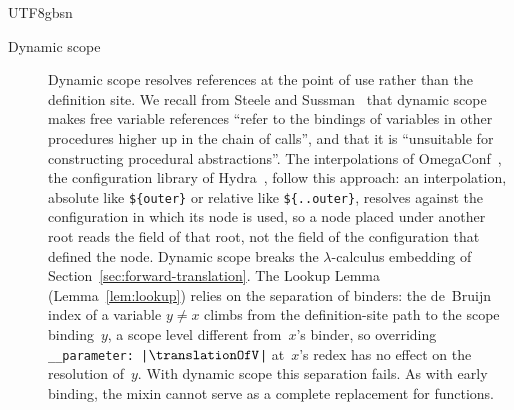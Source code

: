 \begin{CJK*}{UTF8}{gbsn}
\begin{description}
  \item[Dynamic scope]
    Dynamic scope resolves references at the point of use rather than
    the definition site.
    We recall from Steele and
    Sussman~\cite{steele1978-art-of-the-interpreter} that dynamic scope
    makes free variable references ``refer to the bindings of variables
    in other procedures higher up in the chain of calls'', and that it
    is ``unsuitable for constructing procedural abstractions''.
    The interpolations of OmegaConf~\cite{yadan2018-omegaconf}, the
    configuration library of Hydra~\cite{yadan2023-hydra}, follow
    this approach: an interpolation, absolute like
    \texttt{\$\{outer\}} or relative like \texttt{\$\{..outer\}},
    resolves against the configuration in which its node is used, so
    a node placed under another root reads the field of that root,
    not the field of the configuration that defined the node.
    Dynamic scope breaks the $\lambda$-calculus embedding
    of Section~\ref{sec:forward-translation}.
    The Lookup Lemma (Lemma~\ref{lem:lookup})
    relies on the separation of binders:
    the de~Bruijn index of a variable $y \neq x$ climbs from the
    definition-site path to the scope binding~$y$, a scope
    level different from~$x$'s binder, so overriding
    \texttt{__parameter: |$\translationOfV$|} at~$x$'s redex
    has no effect on the resolution of~$y$.
    With dynamic scope this separation fails.
    As with early binding, the mixin cannot serve as a complete
    replacement for functions.


\end{description}
\end{CJK*}

